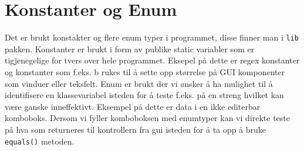 \section{Konstanter og Enum}
Det er brukt konstakter og flere enum typer i programmet, disse finner man i \texttt{lib} pakken. Konstanter er brukt i form av publike static variabler som er tigjenegelige for tvers over hele programmet. Eksepel på dette er regex konstanter og konstanter som f.eks. b rukes til å sette opp størrelse på GUI komponenter som vinduer eller teksfelt. Enum er brukt der vi ønsker å ha mulighet til å identifisere en klassevariabel isteden for å teste f.eks. på en streng hvilket kan være ganske inneffektivt. Eksempel på dette er data i en ikke editerbar komboboks. Dersom vi fyller komboboksen med enumtyper kan vi direkte teste på hva som returneres til kontrollern fra gui isteden for å ta opp å bruke \texttt{equals()} metoden. 